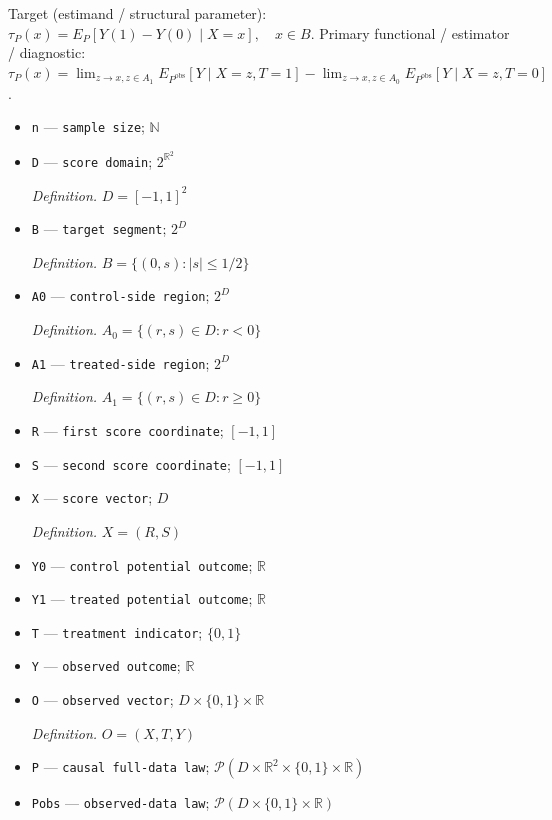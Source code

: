 \documentclass{article}
\begin{document}
Target (estimand / structural parameter): \(\tau_P(x)=E_P[Y(1)-Y(0)\mid X=x],\quad x\in B\).
Primary functional / estimator / diagnostic: \(\tau_P(x)=\lim_{z\to x,z\in A_1}E_{P^{\mathrm{obs}}}[Y\mid X=z,T=1]-\lim_{z\to x,z\in A_0}E_{P^{\mathrm{obs}}}[Y\mid X=z,T=0]\).
\begin{itemize}
  \item \texttt{n} --- \texttt{sample size}; \(\mathbb N\)
  \item \texttt{D} --- \texttt{score domain}; \(2^{\mathbb R^2}\)
  \par\smallskip\noindent\emph{Definition.} \(D=[-1,1]^2\)
  \item \texttt{B} --- \texttt{target segment}; \(2^D\)
  \par\smallskip\noindent\emph{Definition.} \(B=\{(0,s):|s|\leq1/2\}\)
  \item \texttt{A0} --- \texttt{control-\allowbreak{}side region}; \(2^D\)
  \par\smallskip\noindent\emph{Definition.} \(A_0=\{(r,s)\in D:r<0\}\)
  \item \texttt{A1} --- \texttt{treated-\allowbreak{}side region}; \(2^D\)
  \par\smallskip\noindent\emph{Definition.} \(A_1=\{(r,s)\in D:r\geq0\}\)
  \item \texttt{R} --- \texttt{first score coordinate}; \([-1,1]\)
  \item \texttt{S} --- \texttt{second score coordinate}; \([-1,1]\)
  \item \texttt{X} --- \texttt{score vector}; \(D\)
  \par\smallskip\noindent\emph{Definition.} \(X=(R,S)\)
  \item \texttt{Y0} --- \texttt{control potential outcome}; \(\mathbb R\)
  \item \texttt{Y1} --- \texttt{treated potential outcome}; \(\mathbb R\)
  \item \texttt{T} --- \texttt{treatment indicator}; \(\{0,1\}\)
  \item \texttt{Y} --- \texttt{observed outcome}; \(\mathbb R\)
  \item \texttt{O} --- \texttt{observed vector}; \(D\times\{0,1\}\times\mathbb R\)
  \par\smallskip\noindent\emph{Definition.} \(O=(X,T,Y)\)
  \item \texttt{P} --- \texttt{causal full-\allowbreak{}data law}; \(\mathcal P(D\times\mathbb R^2\times\{0,1\}\times\mathbb R)\)
  \item \texttt{Pobs} --- \texttt{observed-\allowbreak{}data law}; \(\mathcal P(D\times\{0,1\}\times\mathbb R)\)

\end{itemize}
\end{document}
